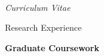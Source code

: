 \documentclass[10pt]{article}
\newenvironment{sublist}{%
	\begin{list}{}{%
		\setlength{\itemsep}{0em}\setlength{\parsep}{0em}%
		\setlength{\topsep}{0em}\setlength{\parskip}{0em}%
	}%
}%
{ \end{list} }
\begin{document}
\begin{cv}{\name\\{\large \itshape Curriculum Vitae}}
\setlength{\cvlabelwidth}{\oldcvlabelwidth}

\pagebreak

\setlength{\oldcvlabelwidth}{\cvlabelwidth}
\setlength{\cvlabelwidth}{1em}
\begin{cvlist}{Research Experience}
	\item \textbf{Graduate Coursework}
	\begin{sublist}
		

\end{sublist}
\end{cvlist}
\end{cv}
\end{document}
